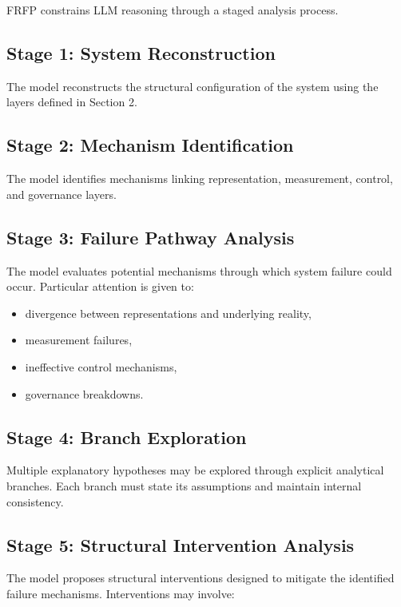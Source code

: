 FRFP constrains LLM reasoning through a staged analysis process.

\subsection{Stage 1: System Reconstruction}

The model reconstructs the structural configuration of the system using the layers defined in Section 2.

\subsection{Stage 2: Mechanism Identification}

The model identifies mechanisms linking representation, measurement, control, and governance layers.

\subsection{Stage 3: Failure Pathway Analysis}

The model evaluates potential mechanisms through which system failure could occur. Particular attention is given to:

\begin{itemize}
\item divergence between representations and underlying reality,
\item measurement failures,
\item ineffective control mechanisms,
\item governance breakdowns.
\end{itemize}

\subsection{Stage 4: Branch Exploration}

Multiple explanatory hypotheses may be explored through explicit analytical branches. Each branch must state its assumptions and maintain internal consistency.

\subsection{Stage 5: Structural Intervention Analysis}

The model proposes structural interventions designed to mitigate the identified failure mechanisms. Interventions may involve:

